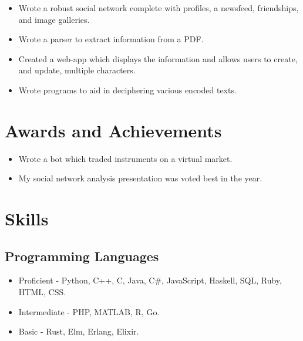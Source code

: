 \documentclass{jcgcv}
\begin{document}
\begin{column}
\begin{itemize}
  \item Wrote a robust social network complete with profiles, a newsfeed, friendships, and image galleries.
\end{itemize}

\begin{itemize}
  \item Wrote a parser to extract information from a PDF.
  \item Created a web-app which displays the information and allows users to create, and update, multiple characters.
\end{itemize}

\begin{itemize}
  \item Wrote programs to aid in deciphering various encoded texts.
\end{itemize}



\section{Awards and Achievements}

\begin{itemize}
  \item Wrote a bot which traded instruments on a virtual market.
\end{itemize}

\begin{itemize}
  \item My social network analysis presentation was voted best in the year.
\end{itemize}



\section{Skills}

\subsection{Programming Languages}
\begin{itemize}
  \item Proficient - Python, C++, C, Java, C\#, JavaScript, Haskell, SQL, Ruby, HTML, CSS.
  \item Intermediate - PHP, MATLAB, R, Go.
  \item Basic - Rust, Elm, Erlang, Elixir.
\end{itemize}


\end{column}
\end{document}
